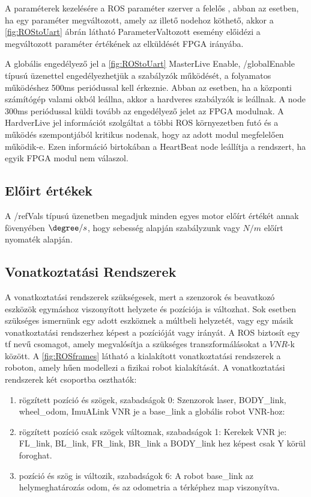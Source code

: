 A paraméterek kezelésére a ROS paraméter szerver a felelős \cite{parameterserver}, abban az esetben, ha egy paraméter megváltozott, amely az illető nodehoz köthető, akkor a \ref{fig:ROStoUart} ábrán látható ParameterValtozott esemény előidézi a  megváltozott paraméter értékének az elküldését FPGA irányába.

A globális engedélyező jel a \ref{fig:ROStoUart} MasterLive Enable,  /globalEnable típusú üzenettel engedélyezhetjük a szabályzók működését, a folyamatos működéshez 500ms periódussal kell érkeznie. Abban az esetben, ha a központi számítógép valami okból leállna, akkor a hardveres szabályzók is leállnak. A node 300ms periódussal küldi tovább az engedélyező jelet az FPGA modulnak. A HardverLive jel információt szolgáltat a többi ROS környezetben futó és a működés szempontjából kritikus nodenak, hogy az adott modul megfelelően működik-e. Ezen információ birtokában a HeartBeat node leállítja a rendszert, ha egyik FPGA modul nem válaszol.

\renewcommand{\img}{SajatRobot/ROS/NodeUML.jpg}
\renewcommand{\sources}{*}
\renewcommand{\captionn}{ROS integrálása Uart protokolhoz.}
\renewcommand{\figlabel}{ROStoUart}


\subsection{Előirt értékek}
A /refVals típusú üzenetben megadjuk minden egyes motor előírt értékét annak fövenyében $\degree/s$, hogy sebesség alapján szabályzunk vagy $N/m$ előírt nyomaték alapján.


\subsection{Vonatkoztatási Rendszerek }
A vonatkoztatási rendszerek szükségesek, mert a szenzorok és beavatkozó eszközök egymáshoz viszonyított helyzete és pozíciója is változhat. Sok esetben szükséges ismernünk egy adott eszköznek a múltbeli helyzetét, vagy egy másik vonatkoztatási rendszerhez képest a pozícióját vagy irányát. A ROS biztosít egy tf \cite{rosTF} nevű csomagot, amely megvalósítja a szükséges transzformálásokat a $VNR$-k között. 
A \ref{fig:ROSframes} látható a kialakított vonatkoztatási rendszerek a roboton, amely hűen modellezi a fizikai robot kialakítását.
A vonatkoztatási rendszerek két csoportba oszthatók:

\begin{enumerate}[label=(\alph*)]
\item rögzített pozíció és szögek, szabadságok 0:
Szenzorok laser, BODY\_link, wheel\_odom, ImuALink VNR je a base\_link a globális robot VNR-hoz:
\item rögzített pozíció csak szögek változnak, szabadságok 1: Kerekek VNR je: FL\_link, BL\_link, FR\_link, BR\_link a BODY\_link hez képest csak Y körül foroghat.
\item pozíció és szög is változik, szabadságok 6:
A robot base\_link az helymeghatározás odom, és az odometria a térképhez map viszonyítva.
\end{enumerate}


